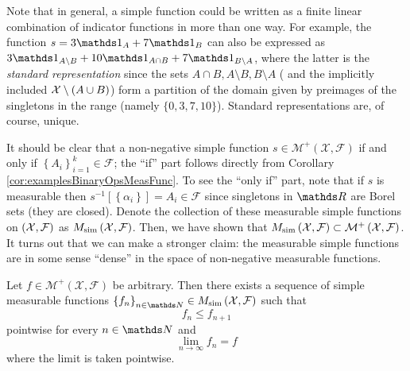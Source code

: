 \begin{rem*}
Note that in general, a simple function could be written as a finite
linear combination of indicator functions in more than one way. For
example, the function $s=3\indicate_{A}+7\indicate_{B}$ can also
be expressed as $3\indicate_{A\setminus B}+10\indicate_{A\cap B}+7\indicate_{B\setminus A}$,
where the latter is the \emph{standard representation }since the sets
$A\cap B,A\setminus B,B\setminus A$ ( and the implicitly included
$\mathcal{X}\setminus\left(A\cup B\right)$) form a partition of the domain
given by preimages of the singletons in the range (namely $\{0,3,7,10\}$).
Standard representations are, of course, unique.
\end{rem*}
It should be clear that a non-negative simple function $s\in\mathcal{M^{+}}\left(\mathcal{X},\mathcal{F}\right)$
if and only if $\left\{ A_{i}\right\} _{i=1}^{k}\in\mathcal{F}$;
the ``if'' part follows directly from Corollary \ref{cor:examplesBinaryOpsMeasFunc}.
To see the ``only if'' part, note that if $s$ is measurable then
$s^{-1}\left[\left\{ \alpha_{i}\right\} \right]=A_{i}\in\mathcal{F}$
since singletons in $\R$ are Borel sets (they are closed). Denote
the collection of these measurable simple functions on $\left(\mathcal{X},\mathcal{F}\right)$
as $M_{\textnormal{sim}}\left(\mathcal{X},\mathcal{F}\right)$. Then, we have
shown that $M_{\textnormal{sim}}\left(\mathcal{X},\mathcal{F}\right)\subset\mathcal{M^{+}}\left(\mathcal{X},\mathcal{F}\right)$.
It turns out that we can make a stronger claim: the measurable simple
functions are in some sense ``dense'' in the space of non-negative
measurable functions.
\begin{prop}
\label{prop:simpleFunctionMonotoneConvergence}Let $f\in\mathcal{M^{+}}\left(\mathcal{X},\mathcal{F}\right)$
be arbitrary. Then there exists a sequence of simple measurable functions
$\left\{ f_{n}\right\} _{n\in\N}\in M_{\textnormal{sim}}\left(\X,\mathcal{F}\right)$
such that
\[
f_{n}\leq f_{n+1}
\]
pointwise for every $n\in\N$ and
\[
\lim_{n\to\infty}f_{n}=f
\]
where the limit is taken pointwise.
\end{prop}

